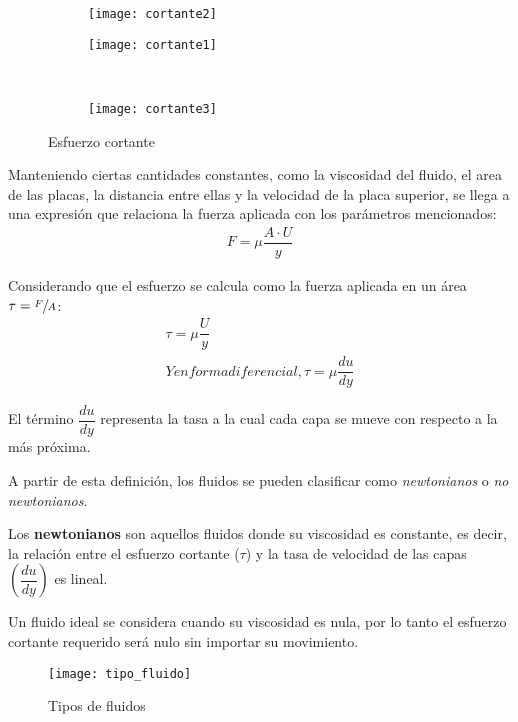 \begin{figure}[h]
	\centering
	\begin{subfigure}[b]{0.45\linewidth}
		\flushright
		\texttt{[image: cortante2]}
	\end{subfigure}
	\begin{subfigure}[b]{0.45\linewidth}
		\flushleft
		\texttt{[image: cortante1]}
	\end{subfigure}
	\\
	\begin{subfigure}[b]{.9\linewidth}
		\centering
		\texttt{[image: cortante3]}
	\end{subfigure}
	\caption{Esfuerzo cortante}
\end{figure}

Manteniendo ciertas cantidades constantes, como la viscosidad del fluido, el area de las placas, la distancia entre ellas y la velocidad de la placa superior, se llega a una expresión que relaciona la fuerza aplicada con los parámetros mencionados:
\begin{gather}
	F = \mu \dfrac{A \cdot U}{y}
\end{gather}

Considerando que el esfuerzo se calcula como la fuerza aplicada en un área $\tau = \sfrac{F}{A}$:
\begin{gather}
	\tau = \mu \dfrac{U}{y}\\ Y en forma diferencial, \tau = \mu \dfrac{du}{dy}
\end{gather}

El término $\dfrac{du}{dy}$ representa la tasa a la cual cada capa se mueve con respecto a la más próxima.\\ \vspace{.5cm}

A partir de esta definición, los fluidos se pueden clasificar como \textit{newtonianos} o \textit{no newtonianos}.


Los \textbf{newtonianos} son aquellos fluidos donde su viscosidad es constante, es decir, la relación entre el esfuerzo cortante ($\tau$) y la tasa de velocidad de las capas $\left(\dfrac{du}{dy}\right)$ es lineal.

Un fluido ideal se considera cuando su viscosidad es nula, por lo tanto el esfuerzo cortante requerido será nulo sin importar su movimiento.

\begin{figure}[h]
	\centering
	\texttt{[image: tipo\_fluido]}
	\caption{Tipos de fluidos}
\end{figure}

